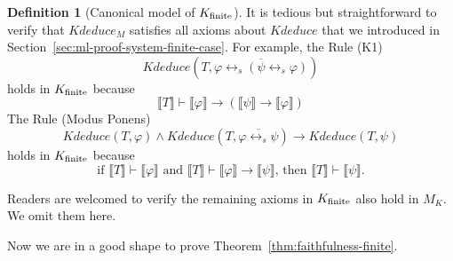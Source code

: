 \documentclass[UTF8,11pt]{article}
\newcounter{thmcounter}
\theoremstyle{plain}
\theoremstyle{definition}
\newtheorem{definition} [thmcounter]{Definition}
\theoremstyle{remark}
\newcommand{\Bracket}[1]{\llbracket#1\rrbracket}
\newcommand{\Kdeduce}{\mathit{Kdeduce}}
\begin{document}
\begin{definition}[Canonical model of ${K_\text{finite}}$]
    It is tedious but straightforward to verify that $\Kdeduce_M$ satisfies all axioms about $\Kdeduce$ that we introduced in Section~\cref{sec:ml-proof-system-finite-case}.
    For example, the Rule (K1)
    \begin{equation*}
    \Kdeduce(T, \overline{\varphi \leftrightarrow_s (\psi \leftrightarrow_s \varphi)})
    \end{equation*}
    holds in ${K_\text{finite}}$ because
    $$\Bracket{T} \vdash \Bracket{\varphi} \to (\Bracket{\psi} \to \Bracket{\varphi})$$
    The Rule (Modus Ponens)
    \begin{equation*}
    \Kdeduce(T, \varphi) \wedge \Kdeduce(T, \overline{\varphi \leftrightarrow_s \psi}) \to 
    \Kdeduce(T, \psi)
    \end{equation*}
    holds in ${K_\text{finite}}$ because
    $$\text{if $\Bracket{T} \vdash \Bracket{\varphi}$ and $\Bracket{T} \vdash \Bracket{\varphi} \to \Bracket{\psi}$, then $\Bracket{T} \vdash \Bracket{\psi}$}.$$
    
    Readers are welcomed to verify the remaining axioms in ${K_\text{finite}}$ also hold in $M_K$.
    We omit them here.
    

\end{definition}


Now we are in a good shape to prove Theorem~\ref{thm:faithfulness-finite}.
\end{document}
